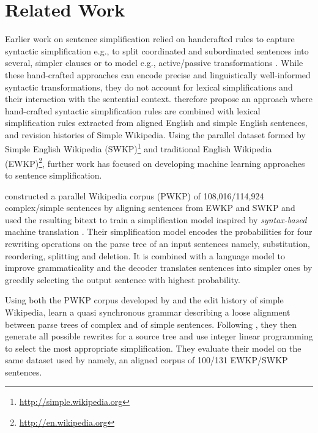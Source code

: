 \documentclass[11pt,a4paper]{article}
\begin{document}
\section{Related Work}
\label{sec:related}

Earlier work on sentence simplification relied on handcrafted rules to
capture syntactic simplification e.g., to split coordinated and
subordinated sentences into several, simpler clauses or to model e.g.,
active/passive transformations
\cite{siddharthan2002architecture,chandrasekar1997automatic,canning2002syntactic,siddharthan2011text,siddharthan2010complex}.
While these hand-crafted approaches can encode precise and
linguistically well-informed syntactic transformations, they do not
account for lexical simplifications and their interaction with the
sentential context.  therefore
propose an approach where hand-crafted syntactic simplification rules
are combined with lexical simplification rules extracted from aligned
English and simple English sentences, and revision histories of Simple
Wikipedia.
Using the parallel dataset formed by Simple English Wikipedia
(SWKP)\footnote{\url{http://simple.wikipedia.org}} and traditional English Wikipedia
(EWKP)\footnote{\url{http://en.wikipedia.org}}, further work has
focused on developing machine learning approaches to sentence
simplification.

 constructed a parallel Wikipedia corpus
(PWKP) of 108,016/114,924 complex/simple sentences by aligning
sentences from EWKP and SWKP and used the resulting bitext to train a
simplification model inspired by \emph{syntax-based} machine
translation \cite{yamada2001syntax}. Their simplification model
encodes the probabilities for four rewriting operations on the parse
tree of an input sentences namely, substitution, reordering, splitting
and deletion. It is combined with a language model to improve
grammaticality and the decoder translates sentences into simpler ones
by greedily selecting the output sentence with highest probability.

Using both the PWKP corpus developed by 
and the edit history of simple Wikipedia,
 learn a quasi synchronous grammar
\cite{smith2006quasi} describing a loose alignment between parse trees
of complex and of simple sentences. Following ,
they then generate all possible rewrites for a source tree and use
integer linear programming to select the most appropriate
simplification. They evaluate their model on the same dataset used by
 namely, an aligned corpus of 100/131
EWKP/SWKP sentences.
\end{document}
